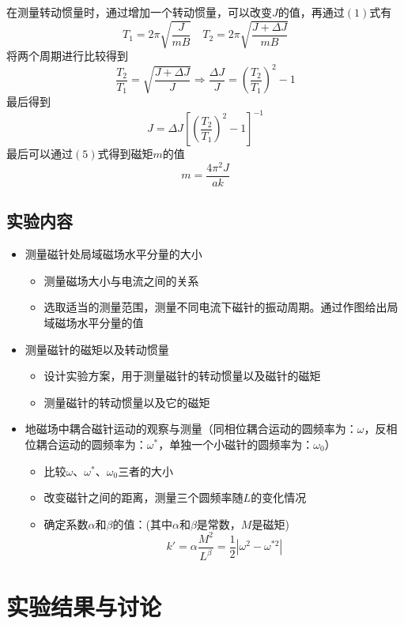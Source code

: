 \documentclass{article}
\begin{document}
在测量转动惯量时，通过增加一个转动惯量，可以改变$J$的值，再通过$(1)$式有$$T_1=2\pi \sqrt{\frac{J}{mB}} \quad T_2=2\pi \sqrt{\frac{J+\Delta J}{mB}}$$
将两个周期进行比较得到$$\frac{T_2}{T_1}=\sqrt{\frac{J+\Delta J}{J}} \Longrightarrow \frac{\Delta J}{J}=(\frac{T_2}{T_1})^2-1$$
最后得到
\begin{equation}
    J=\Delta J[(\frac{T_2}{T_1})^2-1]^{-1}
\end{equation}
最后可以通过$(5)$式得到磁矩$m$的值
\begin{equation}
    m=\frac{4\pi ^2J}{ak}
\end{equation}
\subsection{实验内容}
\begin{itemize}
    \item 测量磁针处局域磁场水平分量的大小
    \begin{itemize}
        \item 测量磁场大小与电流之间的关系
        \item 选取适当的测量范围，测量不同电流下磁针的振动周期。通过作图给出局域磁场水平分量的值
    \end{itemize}
    \item 测量磁针的磁矩以及转动惯量
    \begin{itemize}
        \item 设计实验方案，用于测量磁针的转动惯量以及磁针的磁矩
        \item 测量磁针的转动惯量以及它的磁矩
    \end{itemize}
    \item 地磁场中耦合磁针运动的观察与测量（同相位耦合运动的圆频率为：$\omega$，反相位耦合运动的圆频率为：$\omega^*$，单独一个小磁针的圆频率为：$\omega_0$）
    \begin{itemize}
        \item 比较$\omega$、$\omega^*$、$\omega_0$三者的大小
        \item 改变磁针之间的距离，测量三个圆频率随$L$的变化情况
        \item 确定系数$\alpha $和$\beta$的值：(其中$\alpha$和$\beta$是常数，$M$是磁矩)
        \begin{equation}
            k'=\alpha\frac{M^2}{L^\beta}=\frac{1}{2}\left|\omega^2-\omega^{*2}\right|
        \end{equation}
    \end{itemize}
\end{itemize}
\section{实验结果与讨论}
\end{document}

